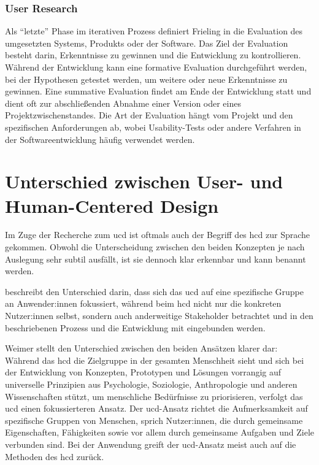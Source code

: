 \documentclass[a4paper,12pt,twoside]{scrreprt}
\begin{document}
\subsubsection*{User Research}
\label{sub-sub-sec:user-research}

Als \enquote{letzte} Phase im iterativen Prozess definiert Frieling in \cite{frieling_user_2019} die Evaluation des umgesetzten Systems, Produkts oder der Software. Das Ziel der Evaluation besteht darin, Erkenntnisse zu gewinnen und die Entwicklung zu kontrollieren. Während der Entwicklung kann eine formative Evaluation durchgeführt werden, bei der Hypothesen getestet werden, um weitere oder neue Erkenntnisse zu gewinnen. Eine summative Evaluation findet am Ende der Entwicklung statt und dient oft zur abschließenden Abnahme einer Version oder eines Projektzwischenstandes. Die Art der Evaluation hängt vom Projekt und den spezifischen Anforderungen ab, wobei Usability-Tests oder andere Verfahren in der Softwareentwicklung häufig verwendet werden. \cite{frieling_user_2019}

\section{Unterschied zwischen User- und Human-Centered Design}
\label{sec:unterschied-ucd-hcd}

Im Zuge der Recherche zum \acl{ucd} ist oftmals auch der Begriff des \ac{hcd} zur Sprache gekommen. Obwohl die Unterscheidung zwischen den beiden Konzepten je nach Auslegung sehr subtil ausfällt, ist sie dennoch klar erkennbar und kann benannt werden.

\medskip

\cite{ionos_se_user-centered_2022} beschreibt den Unterschied darin, dass sich das \ac{ucd} auf eine spezifische Gruppe an Anwender:innen fokussiert, während beim \ac{hcd} nicht nur die konkreten Nutzer:innen selbst, sondern auch anderweitige Stakeholder betrachtet und in den beschriebenen Prozess und die Entwicklung mit eingebunden werden.

\medskip

Weimer stellt den Unterschied zwischen den beiden Ansätzen klarer dar: Während das \ac{hcd} die Zielgruppe in der gesamten Menschheit sieht und sich bei der Entwicklung von Konzepten, Prototypen und Lösungen vorrangig auf universelle Prinzipien aus Psychologie, Soziologie, Anthropologie und anderen Wissenschaften stützt, um menschliche Bedürfnisse zu priorisieren, verfolgt das \ac{ucd} einen fokussierteren Ansatz. Der \ac{ucd}-Ansatz richtet die Aufmerksamkeit auf spezifische Gruppen von Menschen, sprich Nutzer:innen, die durch gemeinsame Eigenschaften, Fähigkeiten sowie vor allem durch gemeinsame Aufgaben und Ziele verbunden sind. Bei der Anwendung greift der \ac{ucd}-Ansatz meist auch auf die Methoden des \ac{hcd} zurück. \cite{weimer_difference_2022}
\end{document}
